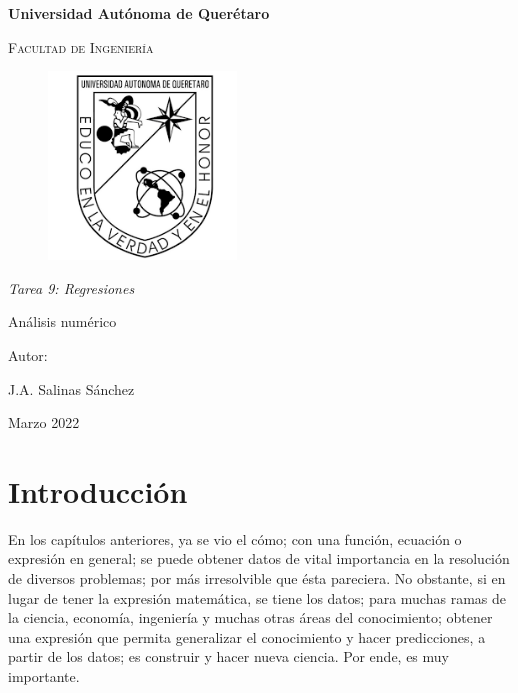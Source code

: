 \documentclass[12pt,oneside,FLEQN]{report}
\begin{document}
{
\selectfont
\begin{titlepage}
        \topmargin=0cm
        \centering

        {\bfseries\LARGE Universidad Autónoma de Querétaro \par}
        \vspace{1cm}
        {\scshape\Large  Facultad de Ingenier\'ia  \par}
        \vspace{2cm}
        \centering
        \begin{figure}[!h]
        \centering
                \includegraphics[height=5cm]{Logouaq.png}
        \end{figure}
        \vspace{3cm}
        {\itshape\large Tarea 9: Regresiones\par}
        \vspace{3cm}
        {\Huge Análisis numérico \par}
        \vspace{2cm}
        {\Large Autor: \par}
        {\large J.A. Salinas Sánchez \par}
        {\large Marzo 2022 \par}
\end{titlepage}
\tableofcontents
\chapter{Introducción}
En los capítulos anteriores, ya se vio el cómo; con una función, ecuación o expresión en general; se puede obtener datos de vital importancia en la resolución de diversos problemas; por más irresolvible que ésta pareciera. No obstante, si en lugar de tener la expresión matemática, se tiene los datos; para muchas ramas de la ciencia, economía, ingeniería y muchas otras áreas del conocimiento; obtener una expresión que permita generalizar el conocimiento y hacer predicciones, a partir de los datos; es construir y hacer nueva ciencia. Por ende, es muy importante.\\

}
\end{document}
